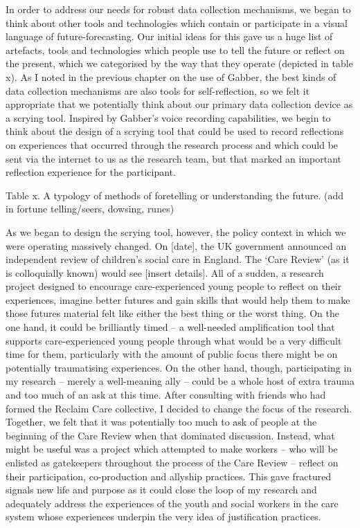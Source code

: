 In order to address our needs for robust data collection mechanisms, we began to think about other tools and technologies which contain or participate in a visual language of future-forecasting. Our initial ideas for this gave us a huge list of artefacts, tools and technologies which people use to tell the future or reflect on the present, which we categorised by the way that they operate (depicted in table x). As I noted in the previous chapter on the use of Gabber, the best kinds of data collection mechanisms are also tools for self-reflection, so we felt it appropriate that we potentially think about our primary data collection device as a scrying tool. Inspired by Gabber’s voice recording capabilities, we begin to think about the design of a scrying tool that could be used to record reflections on experiences that occurred through the research process and which could be sent via the internet to us as the research team, but that marked an important reflection experience for the participant.

Table x. A typology of methods of foretelling or understanding the future. (add in fortune telling/seers, dowsing, runes)

As we began to design the scrying tool, however, the policy context in which we were operating massively changed. On [date], the UK government announced an independent review of children’s social care in England. The ‘Care Review’ (as it is colloquially known) would see [insert details]. All of a sudden, a research project designed to encourage care-experienced young people to reflect on their experiences, imagine better futures and gain skills that would help them to make those futures material felt like either the best thing or the worst thing. On the one hand, it could be brilliantly timed – a well-needed amplification tool that supports care-experienced young people through what would be a very difficult time for them, particularly with the amount of public focus there might be on potentially traumatising experiences. On the other hand, though, participating in my research – merely a well-meaning ally – could be a whole host of extra trauma and too much of an ask at this time. After consulting with friends who had formed the Reclaim Care collective, I decided to change the focus of the research. Together, we felt that it was potentially too much to ask of people at the beginning of the Care Review when that dominated discussion. Instead, what might be useful was a project which attempted to make workers – who will be enlisted as gatekeepers throughout the process of the Care Review – reflect on their participation, co-production and allyship practices. This gave fractured signals new life and purpose as it could close the loop of my research and adequately address the experiences of the youth and social workers in the care system whose experiences underpin the very idea of justification practices.  

